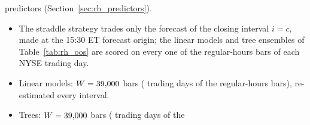 \begin{itemize}
  predictors (Section~\ref{sec:rh_predictors}).
  \begin{itemize}
  \item The straddle strategy trades only the forecast of the closing interval $i = c$, made at the 15:30 ET
    forecast origin; the linear models and tree ensembles of Table~\ref{tab:rh_oos} are scored on every one
    of the \rhorNBars{} regular-hours bars of each NYSE trading day.
  \item Linear models: $W = 39{,}000$ bars (\rhorWindowDays{} trading days of the \rhorNBars{} regular-hours bars), re-estimated every interval.
  \item Trees: $W = 39{,}000$ bars (\rheTreeWindowDays{} trading days of the \rheTreeNBars{}

\end{itemize}
\end{itemize}
